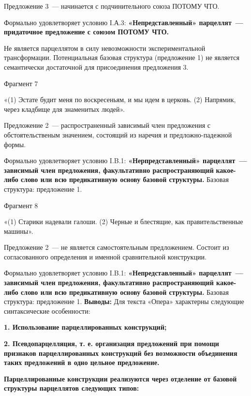 \documentclass{kursa4}
\begin{document}
{     Предложение 3~--- начинается с подчинительного союза ПОТОМУ ЧТО. 

     Формально удовлетворяет условию I.А.3: \textbf{«Непредставленный»
      парцеллят~--- придаточное предложение с союзом ПОТОМУ ЧТО.} 

     Не является парцеллятом в силу невозможности экспериментальной
      трансформации. Потенциальная базовая структура (предложение 1) не
      является семантически достаточной для присоединения предложения 3. 

     Фрагмент 7

     «(1) Эстате будит меня по воскресеньям, и мы идем в церковь. (2)
      Напрямик, через кладбище для знаменитых людей».

     Предложение 2~--- распространенный зависимый член предложения с
      обстоятельственым значением, состоящий из наречия и предложно-падежной
      формы. 

     Формально удовлетворяет условию I.B.1:
      \textbf{«}\textbf{Нерпредставленный» парцеллят~--- зависимый член
      предложения, факультативно распространяющий }\textbf{какое-либо слово
      или всю предикативную основу базовой структуры. }Базовая структура:
      предложение 1.

     Фрагмент 8

     «(1) Старики надевали галоши. (2) Черные и блестящие, как
      правительственные машины».

     Предложение 2~--- не является самостоятельным предложением. Состоит из
      согласованного определения и именной сравнительной конструкции.

     Формально удовлетворяет условию I.B.1:
      \textbf{«}\textbf{Непредставленный» парцеллят~--- зависимый член
      предложения, факультативно распространяющий какое-либо слово или всю
      предикативную основу базовой структуры.} Базовая структура: предложение 1.
     \textbf{Выводы:} \textmd{Для текста «Опера» характерны следующие
      синтаксические особенности:}

      {\bfseries\color[rgb]{0.2,0.2,0.2}
      \textmd{1. Использование парцеллированных конструкций;}}

      {\bfseries\color[rgb]{0.2,0.2,0.2}
      \textmd{2. Псевдопарцелляция, т. е. организация предложений при
      помощи признаков парцеллированных конструкций }\textmd{без возможности
      объединения таких предложений в одно цельное предложение.}}

      {\bfseries\color[rgb]{0.2,0.2,0.2}
      \textmd{}Парцеллированные конструкции\textmd{ }\textmd{реализуются
      через отделение от базовой структуры парцеллятов следующих
      типов}\textmd{:}}

}
\end{document}
